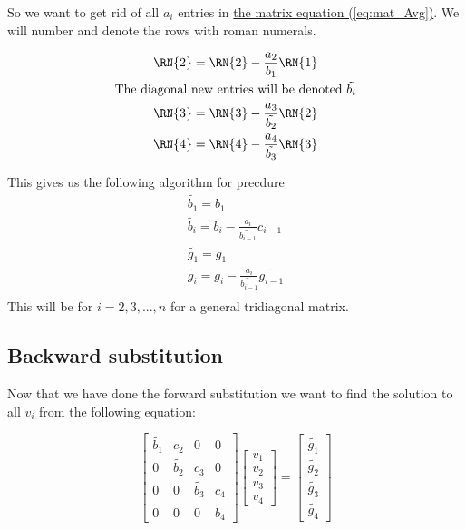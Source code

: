 \documentclass[english,notitlepage]{article}  %
\begin{document}
    So we want to get rid of all $a_i$ entries in \hyperref[eq:mat_Avg]{the matrix equation (\ref*{eq:mat_Avg})}. We will number and denote the rows with roman numerals.

    \begin{gather}
        \RN{2} = \RN{2} - \frac{a_2}{b_1}\RN{1}\\
        \text{The diagonal new entries will be denoted } \tilde{b_i} \nonumber \\
        \RN{3} = \RN{3} - \frac{a_3}{\tilde{b_2}}\RN{2}\\
        \RN{4} = \RN{4} - \frac{a_4}{\tilde{b_3}}\RN{3}\\
    \end{gather}

    This gives us the following algorithm for precdure
    \begin{gather}\label{eq:for}
        \tilde{b_1} = b_1 \\
        \tilde{b_i} = b_i - \frac{a_i}{\tilde{b_{i-1}}}c_{i-1}\\\label{line:for_b}
        \tilde{g_1} = g_1 \\
        \tilde{g_i} = g_i - \frac{a_i}{\tilde{b_{i-1}}}\tilde{g_{i-1}}\\\label{line:for_g}
    \end{gather}
    This will be for $i = 2, 3, ..., n$ for a general tridiagonal matrix.

  \subsection*{Backward substitution}\label{sec:backward}

    Now that we have done the forward substitution we want to find the solution to all $v_i$ from the following equation:

    \begin{equation}
        \begin{bmatrix}
            \tilde{b_1} & c_2 & 0 & 0 \\
            0 & \tilde{b_2} & c_3 & 0 \\
            0 & 0 & \tilde{b_3} & c_4 \\
            0 & 0 & 0 & \tilde{b_4}
        \end{bmatrix} \begin{bmatrix}
            v_1\\
            v_2\\
            v_3\\
            v_4
        \end{bmatrix} = \begin{bmatrix}
            \tilde{g_1}\\
            \tilde{g_2}\\
            \tilde{g_3}\\
            \tilde{g_4}
        \end{bmatrix}
    \end{equation}
\end{document}
